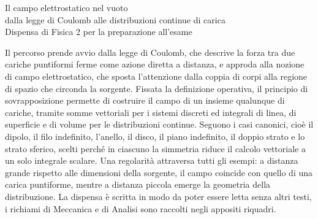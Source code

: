 \documentclass[11pt,a4paper]{article}
\newcommand{\titoletto}[1]{\par\Needspace{4\baselineskip}\medskip\noindent{\large\scshape #1}\par\nopagebreak\smallskip\noindent}
\begin{document}
\begin{center}
{\LARGE Il campo elettrostatico nel vuoto\\[0.4ex]
dalla legge di Coulomb alle distribuzioni continue di carica}\\[1.2ex]
{\large Dispensa di Fisica 2 per la preparazione all'esame}
\end{center}

\vspace{1em}

\titoletto{Sintesi concettuale}
\noindent
Il percorso prende avvio dalla legge di Coulomb, che descrive la forza tra due cariche puntiformi ferme come azione diretta a distanza, e approda alla nozione di campo elettrostatico, che sposta l'attenzione dalla coppia di corpi alla regione di spazio che circonda la sorgente. Fissata la definizione operativa, il principio di sovrapposizione permette di costruire il campo di un insieme qualunque di cariche, tramite somme vettoriali per i sistemi discreti ed integrali di linea, di superficie e di volume per le distribuzioni continue. Seguono i casi canonici, cioè il dipolo, il filo indefinito, l'anello, il disco, il piano indefinito, il doppio strato e lo strato sferico, scelti perché in ciascuno la simmetria riduce il calcolo vettoriale a un solo integrale scalare. Una regolarità attraversa tutti gli esempi: a distanza grande rispetto alle dimensioni della sorgente, il campo coincide con quello di una carica puntiforme, mentre a distanza piccola emerge la geometria della distribuzione. La dispensa è scritta in modo da poter essere letta senza altri testi, i richiami di Meccanica e di Analisi sono raccolti negli appositi riquadri.

\medskip
\end{document}
